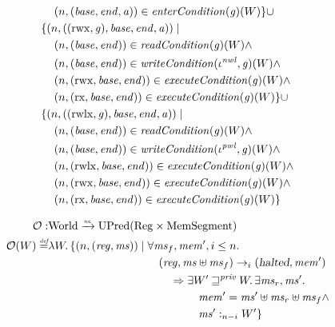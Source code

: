 \documentclass[a4paper]{article}
\newcommand{\nefun}{\xrightarrow{\textit{\tiny{ne}}}}
\newcommand{\defeq}{\stackrel{\textit{\tiny{def}}}{=}}
\newcommand{\union}{\mathbin{\cup}}
\newcommand{\var}[1]{\mathit{#1}}
\newcommand{\hs}{\var{ms}}
\newcommand{\ms}{\hs}
\newcommand{\gl}{\var{g}}
\newcommand{\addr}{\var{a}}
\newcommand{\start}{\var{base}}
\newcommand{\addrend}{\var{end}}
\newcommand{\reg}{\var{reg}}
\newcommand{\heap}{\var{mem}}
\newcommand{\perm}{\var{perm}}
\newcommand{\stdcap}[1][(\perm,\gl)]{\left(#1,\start,\addrend,\addr \right)}
\newcommand{\nwl}{\var{nwl}}
\newcommand{\pwl}{\var{pwl}}
\newcommand{\halted}{\textsl{halted}}
\newcommand{\plainfun}[2]{
  \ifthenelse{\equal{#2}{}}
  {\mathit{#1}}
  {\mathit{#1}(#2)}
}
\newcommand{\readCond}[1]{\plainfun{readCondition}{#1}}
\newcommand{\writeCond}[1]{\plainfun{writeCondition}{#1}}
\newcommand{\execCond}[1]{\plainfun{executeCondition}{#1}}
\newcommand{\entryCond}[1]{\plainfun{enterCondition}{#1}}
\newcommand{\futurestr}{\mathbin{\sqsupseteq}^{\var{priv}}}
\newcommand{\heapSat}[3][\heap]{#1 :_{#2} #3}
\newcommand{\plaindom}[1]{\mathrm{#1}}
\newcommand{\Regs}{\plaindom{Reg}}
\newcommand{\HeapSegments}{\plaindom{MemSegment}}
\newcommand{\Worlds}{\plaindom{World}}
\newcommand{\UPred}[1]{\plaindom{UPred}(#1)}
\newcommand{\observations}{\mathcal{O}}
\newcommand{\npair}[2][n]{\left(#1,#2 \right)}
\newcommand{\plainperm}[1]{\mathrm{#1}}
\newcommand{\exec}{\plainperm{rx}}
\newcommand{\rwx}{\plainperm{rwx}}
\newcommand{\rwlx}{\plainperm{rwlx}}
\newcommand{\step}[1][]{\rightarrow_{#1}}
\begin{document}
\begin{lemma}
\begin{align*}
\begin{aligned}[t]
      & \quad \npair{(\start,\addrend,\addr)} \in \entryCond{}(\gl)(W)\} 
      \union \\
      & \{ \npair{\stdcap[(\rwx,\gl)]} \mid \\
      & \quad \npair{(\start,\addrend)} \in \readCond{}(\gl)(W) \land \\
      & \quad \npair{(\start,\addrend)} \in \writeCond{}(\iota^\nwl,\gl)(W) \land\\
      & \quad \npair{(\rwx,\start,\addrend)} \in \execCond{}(\gl)(W)  \land \\
      & \quad \npair{(\exec,\start,\addrend)} \in \execCond{}(\gl)(W) \}
      \union \\
      & \{ \npair{\stdcap[(\rwlx,\gl)]} \mid \\
      & \quad \npair{(\start,\addrend)} \in \readCond{}(\gl)(W) \land \\
      & \quad \npair{(\start,\addrend)} \in \writeCond{}(\iota^\pwl,\gl)(W) \land\\
      & \quad \npair{(\rwlx,\start,\addrend)} \in \execCond{}(\gl)(W) \land \\
      & \quad \npair{(\rwx,\start,\addrend)} \in \execCond{}(\gl)(W) \land \\
      & \quad \npair{(\exec,\start,\addrend)} \in \execCond{}(\gl)(W) \}
    \end{aligned}
\end{align*}

\begin{align*}
  \observations : &  \Worlds \nefun \UPred{\Regs \times \HeapSegments} \\
  \observations (W) \defeq & \lambda W \ldotp 
                             \{ \npair{(\reg,\hs)} \mid
                             \begin{aligned}[t]
                               & \forall \ms_f, \heap', i \leq n \ldotp \\
                               & \quad(\reg,\hs \uplus \ms_f) \step[i] (\halted,\heap')  \\
                               & \qquad \Rightarrow
                               \begin{aligned}[t]
                                 & \exists W' \futurestr W \ldotp\exists \hs_r, \hs' \ldotp\\
                                 & \quad \heap' = \hs' \uplus \hs_r \uplus \ms_f \land \\ 
                                 & \quad \heapSat[\hs']{n-i}{W'} \}
                               \end{aligned}
                             \end{aligned}
\end{align*}


\end{lemma}
\end{document}
